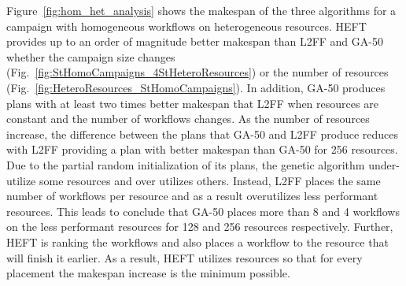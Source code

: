 Figure~\ref{fig:hom_het_analysis} shows the makespan of the three algorithms for a campaign with homogeneous workflows on heterogeneous resources.
HEFT provides up to an order of magnitude better makespan than L2FF and GA-50 whether the campaign size changes (Fig.~\ref{fig:StHomoCampaigns_4StHeteroResources}) or the number of resources (Fig.~\ref{fig:HeteroResources_StHomoCampaigns}).
In addition, GA-50 produces plans with at least two times better makespan that L2FF when resources are constant and the number of workflows changes.
As the number of resources increase, the difference between the plans that GA-50 and L2FF produce reduces with L2FF providing a plan with better makespan than GA-50 for 256 resources.
Due to the partial random initialization of  its plans, the genetic algorithm under-utilize some resources and over utilizes others.
Instead, L2FF places the same number of workflows per resource and as a result overutilizes less performant resources.
This leads to conclude that GA-50 places more than 8 and 4 workflows on the less performant resources for 128 and 256 resources respectively.
Further, HEFT is ranking the workflows and also places a workflow to the resource that will finish it earlier.
As a result, HEFT utilizes resources so that for every placement the makespan increase is the minimum possible.


